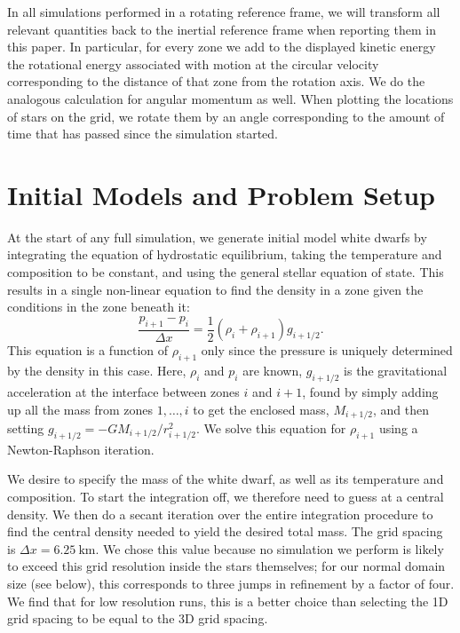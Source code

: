 \documentclass[iop]{../emulateapj}
\begin{document}
In all simulations performed in a rotating reference frame, we will transform all relevant
quantities back to the inertial reference frame when reporting them in this paper. In particular,
for every zone we add to the displayed kinetic energy the rotational energy associated with motion 
at the circular velocity corresponding to the distance of that zone from the rotation axis.
We do the analogous calculation for angular momentum as well. When plotting the locations of 
stars on the grid, we rotate them by an angle corresponding to the amount of time that has 
passed since the simulation started.


\section{Initial Models and Problem Setup}
\label{sec:initial_models}

At the start of any full simulation, we generate initial model white
dwarfs by integrating the equation of hydrostatic equilibrium, taking
the temperature and composition to be constant, and using the general
stellar equation of state.  This results in a single non-linear
equation to find the density in a zone given the conditions in the
zone beneath it:
\begin{equation}
\frac{p_{i+1} - p_i}{\Delta x} = \frac{1}{2} (\rho_i + \rho_{i+1}) g_{i+1/2}.
\end{equation}
This equation is a function of $\rho_{i+1}$ only since the pressure is
uniquely determined by the density in this case. Here, $\rho_i$ and $p_i$
are known, $g_{i+1/2}$ is the gravitational acceleration at the
interface between zones $i$ and $i+1$, found by simply adding up all
the mass from zones $1, \ldots, i$ to get the enclosed mass,
$M_{i+1/2}$, and then setting $g_{i+1/2} =
-GM_{i+1/2}/r_{i+1/2}^2$. We solve this equation for $\rho_{i+1}$
using a Newton-Raphson iteration.

We desire to specify the mass of the white dwarf, as well as its
temperature and composition. To start the integration off, we
therefore need to guess at a central density.  We then do a secant
iteration over the entire integration procedure to find the central
density needed to yield the desired total mass.  The grid spacing is
$\Delta x = 6.25\ \text{km}$. We chose this value because no simulation
we perform is likely to exceed this grid resolution inside the stars 
themselves; for our normal domain size (see below), this corresponds to 
three jumps in refinement by a factor of four. We find that for low 
resolution runs, this is a better choice than selecting the 1D grid 
spacing to be equal to the 3D grid spacing.
\end{document}
